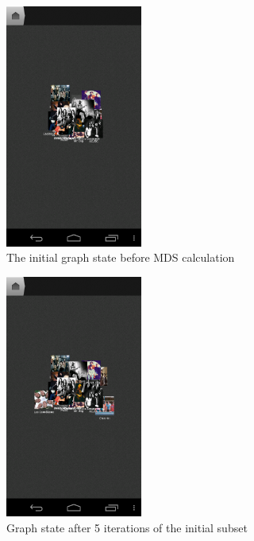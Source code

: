 \begin{figure}[H]
  \centering
    \includegraphics[width=0.4\textwidth]{figures/screen_mds_1_initial}
  \caption{The initial graph state before MDS calculation}
\end{figure}

\begin{figure}[H]
  \centering
    \includegraphics[width=0.4\textwidth]{figures/screen_mds_2_after_5_subset_iterations}
  \caption{Graph state after 5 iterations of the initial subset}
\end{figure}

